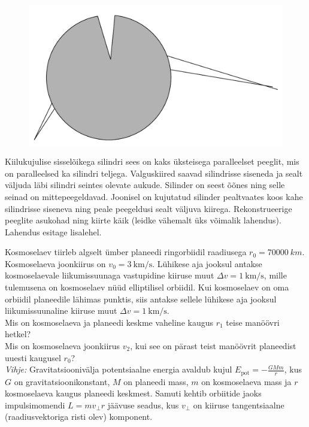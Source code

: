 \documentclass[10pt]{article}
\begin{document}
\setAuthor{}

\begin{figure}
  \vspace{-25pt}
  \begin{center}
  \includegraphics[scale=0.25]{2020-v3g-08-yl.pdf}
  \end{center}
  \vspace{-25pt}
\end{figure}
Kiilukujulise sisselõikega silindri sees on kaks üksteisega paralleelset peeglit,
mis on paralleelsed ka silindri teljega. Valguskiired saavad silindrisse siseneda
ja sealt väljuda läbi silindri seintes olevate aukude. Silinder on seest õõnes
ning selle seinad on mittepeegeldavad. Joonisel on kujutatud
silinder pealtvaates koos kahe silindrisse siseneva ning peale peegeldusi sealt
väljuva kiirega. Rekonstrueerige peeglite asukohad ning kiirte käik (leidke
vähemalt üks võimalik lahendus). Lahendus esitage lisalehel.
\probend
\bigskip


Kosmoselaev tiirleb algselt ümber planeedi ringorbiidil raadiusega $r_0=\SI{70000}{km}$. Kosmoselaeva joonkiirus on $v_0=\SI{3}{\km\per\s}$. Lühikese aja jooksul antakse kosmoselaevale liikumissuunaga vastupidine kiiruse muut $\Delta v=\SI{1}{\km\per\s}$, mille tulemusena on kosmoselaev nüüd elliptilisel orbiidil. Kui kosmoselaev on oma orbiidil planeedile lähimas punktis, siis antakse sellele lühikese aja jooksul liikumissuunaline kiiruse muut $\Delta v=\SI{1}{\km\per\s}$.\\
\osa Mis on kosmoselaeva ja planeedi keskme vaheline kaugus $r_1$ teise manöövri hetkel?\\
\osa Mis on kosmoselaeva joonkiirus $v_2$, kui see on pärast teist manöövrit planeedist uuesti kaugusel $r_0$?\\
\emph{Vihje:} Gravitatsioonivälja potentsiaalne energia avaldub kujul $E_\text{pot} = -\frac{GMm}{r}$, kus $G$ on gravitatsioonikonstant, $M$ on planeedi mass, $m$ on kosmoselaeva mass ja $r$ kosmoselaeva kaugus planeedi keskmest. Samuti kehtib orbiitide jaoks impulsimomendi $L=mv_\perp r$ jäävuse seadus, kus $v_\perp$ on kiiruse tangentsiaalne (raadiusvektoriga risti olev) komponent.
\probend
\bigskip
\end{document}
